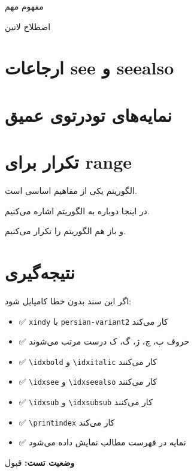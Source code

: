 \documentclass{matinbook}
\begin{document}
مفهوم مهم

اصطلاح لاتین

\section{ارجاعات see و seealso}
\label{sec:see-also}



\section{نمایه‌های تودرتوی عمیق}
\label{sec:deep-nested}




\section{تکرار برای range}
\label{sec:repeated}

الگوریتم یکی از مفاهیم اساسی است.

در اینجا دوباره به الگوریتم اشاره می‌کنیم.

و باز هم الگوریتم را تکرار می‌کنیم.

\section{نتیجه‌گیری}
\label{sec:conclusion}

اگر این سند بدون خطا کامپایل شود:

\begin{itemize}
    \item ✅ \texttt{xindy} با \texttt{persian-variant2} کار می‌کند
    \item ✅ حروف پ، چ، ژ، گ، ک درست مرتب می‌شوند
    \item ✅ \texttt{\textbackslash idxbold} و \texttt{\textbackslash idxitalic} کار می‌کنند
    \item ✅ \texttt{\textbackslash idxsee} و \texttt{\textbackslash idxseealso} کار می‌کنند
    \item ✅ \texttt{\textbackslash idxsub} و \texttt{\textbackslash idxsubsub} کار می‌کنند
    \item ✅ \texttt{\textbackslash printindex} کار می‌کند
    \item ✅ نمایه در فهرست مطالب نمایش داده می‌شود
\end{itemize}

\textbf{وضعیت تست:} قبول

\printindex
\end{document}
